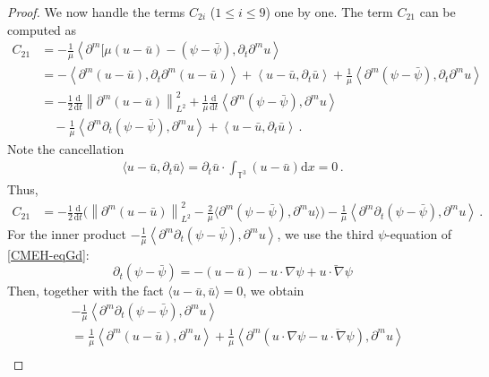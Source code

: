 \documentclass[reqno,11pt]{amsart}
\numberwithin{equation}{section}
\def\p{\partial}
\def\d{\mathrm{d}}
\begin{document}
\begin{proof}
We now handle the terms $C_{2i}$ ($1 \le i \le 9$) one by one. The term $C_{21}$ can be computed as
\begin{align*}
C_{21} &  = -\frac{1}{\mu} \left\langle \partial^m [\mu(u-\bar{u}) -(\psi-\bar{\psi}), \partial_t \partial^m u \right\rangle \\
& = -\left\langle \partial^m (u-\bar{u}), \partial_t \partial^m (u-\bar{u}) \right\rangle + \left\langle u-\bar{u}, \partial_t \bar{u} \right\rangle + \frac{1}{\mu} \left\langle \partial^m (\psi-\bar{\psi}), \partial_t \partial^m u \right\rangle \\
&= -\frac{1}{2} \frac{\d}{\d t} \left\| \partial^m (u-\bar{u}) \right\|_{L^2}^2 + \frac{1}{\mu} \frac{\d}{\d t} \left\langle \partial^m (\psi-\bar{\psi}), \partial^m u \right\rangle \\
&\quad -\frac{1}{\mu} \left\langle \partial^m \partial_t (\psi-\bar{\psi}), \partial^m u \right\rangle + \left\langle u-\bar{u}, \partial_t \bar{u} \right\rangle \,.
\end{align*}
Note the cancellation
\begin{equation*}
\begin{aligned}
\langle u-\bar{u},\p_t \bar{u} \rangle=\p_t\bar{u}\cdot \int_{\mathbb{T}^3}{(u-\bar{u})}\d x=0 \,.
\end{aligned}
\end{equation*}
Thus,
\begin{equation*}
\begin{aligned}
C_{21}&=-\frac{1}{2} \frac{\d}{\d t}\big( \left\| \partial^m (u-\bar{u}) \right\|_{L^2}^2 - \frac{2}{\mu}\langle \partial^m (\psi-\bar{\psi}), \partial^m u \rangle\big) -\frac{1}{\mu} \left\langle \partial^m \partial_t (\psi-\bar{\psi}), \partial^m u \right\rangle \,.
\end{aligned}
\end{equation*}
For the inner product $-\frac{1}{\mu} \left\langle \partial^m \partial_t (\psi-\bar{\psi}), \partial^m u \right\rangle$, we use the third $\psi$-equation of \eqref{CMEH-eqGd}: 
$$
\partial_t \left( \psi - \bar{\psi} \right) = - \left( u - \bar{u} \right) - u \cdot \nabla \psi + \bar{u \cdot \nabla \psi}$$
Then, together with the fact $\langle u-\bar{u},\bar{u}\rangle=0$, we obtain
\begin{align*}
&-\frac{1}{\mu} \left\langle \partial^m \partial_t \left( \psi - \bar{\psi} \right), \partial^m u \right\rangle \\
&= \frac{1}{\mu} \left\langle \partial^m (u - \bar{u}), \partial^m u \right\rangle + \frac{1}{\mu} \left\langle \partial^m \left( u \cdot \nabla \psi -\overline{u \cdot \nabla \psi} \right), \partial^m u \right\rangle \\

\end{align*}
\end{proof}
\end{document}
